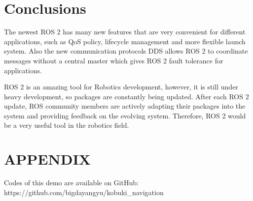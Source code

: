 \documentclass[letterpaper, 10 pt, conference]{ieeeconf}  %
\begin{document}
\section{Conclusions}\label{conclusions}
The newest ROS 2 has many new features that are very convenient for different applications, such as QoS policy, lifecycle management and more flexible launch system. Also the new communication protocols DDS allows ROS 2 to coordinate messages without a central master which gives ROS 2 fault tolerance for applications. 
\par\vspace{5pt} 
ROS 2 is an amazing tool for Robotics development, however, it is still under heavy development, so packages are constantly being updated. After each ROS 2 update, ROS community members are actively adapting their packages into the system and providing feedback on the evolving system. Therefore, ROS 2 would be a very useful tool in the robotics field.  

\addtolength{\textheight}{-12cm}   %

\section*{APPENDIX}
Codes of this demo are available on GitHub: https://github.com/bigdayangyu/kobuki\_navigation
\end{document}
